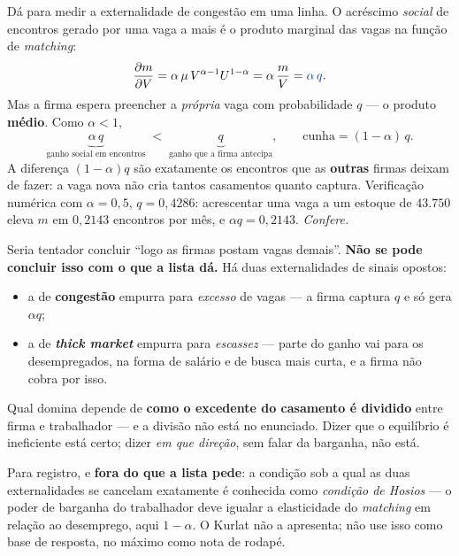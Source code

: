 \documentclass[11pt, a4paper]{article}
\newcommand{\resp}[1]{%
  \ifmmode {\color{darkblue}#1}\else\textcolor{darkblue}{\textbf{#1}}\fi}
\begin{document}
\begin{tcolorbox}[theorybox, title={A forma exata da cunha: produto marginal contra produto médio}]
\small
Dá para medir a externalidade de congestão em uma linha. O acréscimo \emph{social} de
encontros gerado por uma vaga a mais é o produto marginal das vagas na função de
\emph{matching}:
\[
\frac{\partial m}{\partial V} = \alpha\,\mu\,V^{\alpha-1}U^{1-\alpha}
 = \alpha\,\frac{m}{V} = \resp{\alpha\,q} .
\]
Mas a firma espera preencher a \emph{própria} vaga com probabilidade $q$ --- o produto
\textbf{médio}. Como $\alpha<1$,
\[
\underbrace{\alpha\,q}_{\text{ganho social em encontros}}
\;<\;
\underbrace{q}_{\text{ganho que a firma antecipa}} ,
\qquad\text{cunha} = (1-\alpha)\,q .
\]
A diferença $(1-\alpha)q$ são exatamente os encontros que as \textbf{outras} firmas deixam
de fazer: a vaga nova não cria tantos casamentos quanto captura. Verificação numérica com
$\alpha=0{,}5$, $q=0{,}4286$: acrescentar uma vaga a um estoque de $43{.}750$ eleva $m$ em
$0{,}2143$ encontros por mês, e $\alpha q = 0{,}2143$. \emph{Confere.}
\end{tcolorbox}

\begin{tcolorbox}[trapbox, title={Cuidado com a conclusão: o sinal líquido é ambíguo}]
\small
Seria tentador concluir ``logo as firmas postam vagas demais''. \textbf{Não se pode
concluir isso com o que a lista dá.} Há duas externalidades de sinais opostos:
\begin{itemize}
\item a de \textbf{congestão} empurra para \emph{excesso} de vagas --- a firma captura $q$
  e só gera $\alpha q$;
\item a de \textbf{\emph{thick market}} empurra para \emph{escassez} --- parte do ganho vai
  para os desempregados, na forma de salário e de busca mais curta, e a firma não cobra
  por isso.
\end{itemize}
Qual domina depende de \textbf{como o excedente do casamento é dividido} entre firma e
trabalhador --- e a divisão não está no enunciado. Dizer que o equilíbrio é ineficiente
está certo; dizer \emph{em que direção}, sem falar da barganha, não está.

\smallskip
{\footnotesize Para registro, e \textbf{fora do que a lista pede}: a condição sob a qual as
duas externalidades se cancelam exatamente é conhecida como \emph{condição de Hosios} ---
o poder de barganha do trabalhador deve igualar a elasticidade do \emph{matching} em
relação ao desemprego, aqui $1-\alpha$. O Kurlat não a apresenta; não use isso como base
de resposta, no máximo como nota de rodapé.}
\end{tcolorbox}
\end{document}
